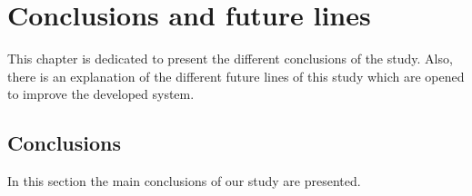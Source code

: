 
\chapter{Conclusions and future lines}
\newpage

This chapter is dedicated to present the different conclusions of the study. Also, there is an explanation of the different future lines of this study which are opened to improve the developed system.

\section{Conclusions}

In this section the main conclusions of our study are presented. 

